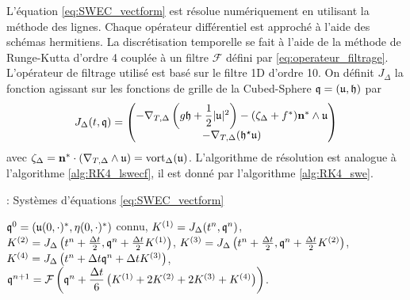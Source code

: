 L'équation \eqref{eq:SWEC_vectform} est résolue numériquement en utilisant la méthode des lignes. Chaque opérateur différentiel est approché à l'aide des schémas hermitiens. La discrétisation temporelle se fait à l'aide de la méthode de Runge-Kutta d'ordre 4 couplée à un filtre $\mathcal{F}$ défini par \eqref{eq:operateur_filtrage}. L'opérateur de filtrage utilisé est basé sur le filtre 1D d'ordre 10.
On définit $J_{\Delta}$ la fonction agissant sur les fonctions de grille de la Cubed-Sphere $\mathfrak{q} = (\mathfrak{u},\mathfrak{h})$ par
\begin{equation}
J_{\Delta}(t,\mathfrak{q}) = \begin{pmatrix}
- \nabla_{T,\Delta} \left( g\mathfrak{h} + \dfrac{1}{2} |\mathfrak{u}|^2 \right) - (\zeta_{\Delta} + f^*) \mathbf{n}^* \wedge \mathfrak{u} \\
- \nabla_{T,\Delta} (\mathfrak{h}^{\star} \mathfrak{u})
\end{pmatrix}
\end{equation}
avec $\zeta_{\Delta} = \mathbf{n}^* \cdot (\nabla_{T,\Delta} \wedge \mathfrak{u}) = \text{vort}_{\Delta}(\mathfrak{u})$. L'algorithme de résolution est analogue à l'algorithme \ref{alg:RK4_lswecf}, il est donné par l'algorithme \ref{alg:RK4_swe}.

\begin{center}
\begin{minipage}[H]{12cm}
  \begin{algorithm}[H]
    \caption{: Systèmes d'équations \eqref{eq:SWEC_vectform} }\label{alg:RK4_swe}
    \begin{algorithmic}[1]
    \State $\mathfrak{q}^0 = (\mathfrak{u}(0,\cdot)^* , \mathbf{\eta}(0,\cdot)^*)$ connu,
             \State  $K^{(1)} = J_{\Delta}(t^n, \mathfrak{q}^n)$,
             \State  $K^{(2)} = J_{\Delta}\left(t^n + \frac{\Delta t}{2}, \mathfrak{q}^n + \frac{\Delta t}{2} K^{(1)} \right)$,
             \State  $K^{(3)} = J_{\Delta}\left(t^n + \frac{\Delta t}{2}, \mathfrak{q}^n + \frac{\Delta t}{2} K^{(2)} \right)$,
             \State  $K^{(4)} = J_{\Delta}\left(t^n + \Delta t \mathfrak{q}^n + \Delta t K^{(3)} \right)$,  
             \State  $\mathfrak{q}^{n+1} = \mathcal{F}\left( \mathfrak{q}^n  + \dfrac{\Delta t}{6} \left( K^{(1)} + 2 K^{(2)} + 2 K^{(3)} + K^{(4)} \right) \right)$.
            \EndFor
    \end{algorithmic}
    \end{algorithm}
\end{minipage}
\end{center} 

